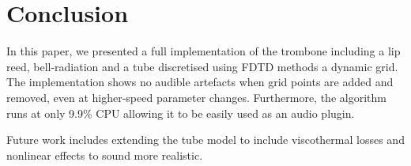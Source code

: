 \section{Conclusion}\label{sec:conclusion}
In this paper, we presented a full implementation of the trombone including a lip reed, bell-radiation and a tube discretised using FDTD methods a dynamic grid. The implementation shows no audible artefacts when grid points are added and removed, even at higher-speed parameter changes. Furthermore, the algorithm runs at only 9.9\% CPU allowing it to be easily used as an audio plugin. 

Future work includes extending the tube model to include viscothermal losses and nonlinear effects to sound more realistic.